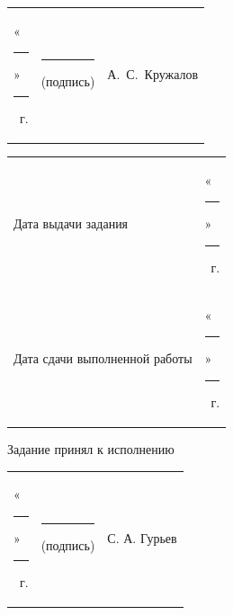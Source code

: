 \documentclass[14pt, a4paper]{extarticle}
\begin{document}
{
\renewcommand{\arraystretch}{2}
\noindent
\begin{tabularx}{\textwidth}{@{} P{0.45\textwidth} P{0.3\textwidth} P{0.25\textwidth} @{}}

    «\rule{0.8cm}{0.4pt}» \quad \rule{2cm}{0.4pt} ~г. &
    \centering \rule{3.5cm}{0.4pt} \par \footnotesize (подпись) &
    \hfill А.~С.~Кружалов                                         \\
\end{tabularx}

\begin{tabularx}{\textwidth}{@{} P{0.45\textwidth} P{0.55\textwidth} @{}}
    Дата выдачи задания           &
    \hfill «\rule {0.8cm}{0.4pt}» \quad \rule {2cm}{0.4pt} ~г. \\

    Дата сдачи выполненной работы &
    \hfill «\rule{0.8cm}{0.4pt}» \quad \rule{2cm}{0.4pt} ~г. \\
\end{tabularx}
}

Задание принял к исполнению

{
\renewcommand{\arraystretch}{1.5}
\begin{tabularx}{\textwidth}{@{} P{0.45\textwidth} P{0.3\textwidth} P{0.25\textwidth} @{}}

    «\rule{0.8cm}{0.4pt}» \quad \rule{2cm}{0.4pt} ~г. &
    \centering \rule{3.5cm}{0.4pt} \par \footnotesize (подпись) &
    \hfill С. А. Гурьев                                            \\
\end{tabularx}
}
\end{document}
